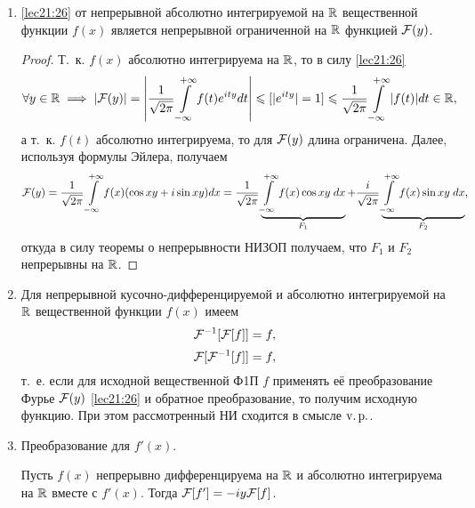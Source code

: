 \documentclass[../../main.tex]{subfiles}
\begin{document}
\begin{enumerate}
  \item \eqref{lec21:26} от непрерывной абсолютно интегрируемой на $\mathbb{R}$ 
  вещественной функции $f(x)$ является непрерывной ограниченной на $\mathbb{R}$ 
  функцией 
  $\mathcal{F}(y)$.
  \begin{proof}
    Т.~к. $f(x)$ абсолютно интегрируема на $\mathbb{R}$, то в силу \eqref{lec21:26}
    \begin{multline*}
      \forall y \in \mathbb{R} \implies |\mathcal{F}(y)| = \left|\frac{1}{\sqrt{2\pi}} \int\limits_{-\infty}^{+\infty} 
      f(t)e^{ity}dt\right| \leqslant [|e^{ity}| = 1] \leqslant \frac{1}{\sqrt{2\pi}} 
      \int\limits_{-\infty}^{+\infty}|f(t)|dt \in \mathbb{R},
    \end{multline*}
    а т.~к. $f(t)$ абсолютно интегрируема, то для $\mathcal{F}(y)$ 
    длина ограничена. Далее, используя формулы Эйлера, получаем
    \begin{multline*}
      \mathcal{F}(y) = \frac{1}{\sqrt{2\pi}} \int\limits_{-\infty}^{+\infty} f(x) (\cos xy + i\sin xy)dx = 
      \frac{1}{\sqrt{2\pi}}
      \underbrace{\int\limits_{-\infty}^{+\infty} f(x) \cos xy\;dx}_{F_1} + \frac{i}{\sqrt{2\pi}} 
      \underbrace{\int\limits_{-\infty}^{+\infty} f(x) \sin xy\;dx}_{F_2},
    \end{multline*}
    откуда в силу теоремы о непрерывности НИЗОП получаем, что $F_1$ и 
    $F_2$ непрерывны на $\mathbb{R}$.
  \end{proof}
  
  \item Для непрерывной кусочно-дифференцируемой и абсолютно интегрируемой 
  на $\mathbb{R}$ вещественной функции $f(x)$ имеем  \[\mathcal{F}^{-1}[\mathcal{F}[f]] = f,\] 
  \[\mathcal{F}[\mathcal{F}^{-1}[f]] = f,\] т.~е. если для исходной вещественной Ф1П $f$ 
  применять её преобразование Фурье $\mathcal{F}(y)$ \eqref{lec21:26} и обратное 
  преобразование, то получим исходную функцию. При этом рассмотренный НИ 
  сходится в смысле $\operatorname{v.p.}$.
  
  \item Преобразование для $f'(x)$.
  
  Пусть $f(x)$ непрерывно дифференцируема на $\mathbb{R}$ и абсолютно интегрируема 
  на $\mathbb{R}$ вместе с $f'(x)$. Тогда $\mathcal{F}[f'] = -iy\mathcal{F}[f]$.
  

\end{enumerate}
\end{document}
